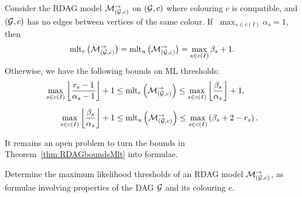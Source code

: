 \begin{theorem} \label{thm:RDAGboundsMlt} %
	Consider the RDAG model $\mathcal{M}_{(\mathcal{G}, c)}^{\to}$ on $(\mathcal{G}, c)$ where colouring $c$ is compatible, and $(\mathcal{G}, c)$ has no edges between vertices of the same colour. If $\;\max_{s \in c(I)} \alpha_s = 1$, then
		\[\operatorname{mlt}_e \big(\mathcal{M}_{(\mathcal{G}, c)}^{\to}\big) = \operatorname{mlt}_u \big(\mathcal{M}_{(\mathcal{G}, c)}^{\to}\big) = \max_{s \in c(I)} \beta_s + 1 . \]
	Otherwise, we have the following bounds on ML thresholds:
	\begin{align}
		\label{eq:BoundsMltExistence}
		\max_{s \in c(I)} \left\lfloor \frac{r_s-1}{\alpha_s-1} \right\rfloor + 1  &\leq \operatorname{mlt}_e \left( \mathcal{M}_{(\mathcal{G}, c)}^{\to} \right) \leq \max_{s \in c(I)}  \left\lfloor \frac{\beta_s}{\alpha_s} \right\rfloor + 1 , \\[5pt]
		\max_{s \in c(I)} \left\lfloor \frac{\beta_s}{\alpha_s} \right\rfloor + 1 &\leq \operatorname{mlt}_u \left( \mathcal{M}_{(\mathcal{G}, c)}^{\to} \right) \leq \max_{s \in c(I)} \left( \beta_s + 2 - r_s \right). \label{eq:BoundsMltUniqueness}
	\end{align}
\end{theorem}

It remains an open problem to turn the bounds in Theorem~\ref{thm:RDAGboundsMlt} into formulae.
\begin{problem} \label{prob:RDAG-thresholds} %
	Determine the maximum likelihood thresholds of an RDAG model $\mathcal{M}_{(\mathcal{G}, c)}^{\to}$, as formulae involving properties of the DAG $\mathcal{G}$ and its colouring $c$.
\end{problem}



